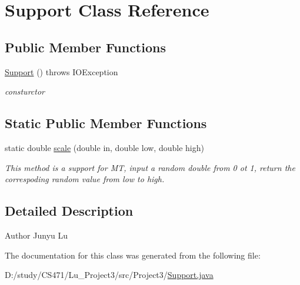 \hypertarget{class_support}{}\section{Support Class Reference}
\label{class_support}
\subsection*{Public Member Functions}
\begin{DoxyCompactItemize}
\item 
\mbox{\label{class_support_a81f1c49c5410f18c834f6bc8a0bf0c01}} 
\mbox{\hyperlink{class_support_a81f1c49c5410f18c834f6bc8a0bf0c01}{Support}} ()  throws I\+O\+Exception 
\begin{DoxyCompactList}\small\item\em consturctor \end{DoxyCompactList}\end{DoxyCompactItemize}
\subsection*{Static Public Member Functions}
\begin{DoxyCompactItemize}
\item 
\mbox{\label{class_support_a993fa1844e5c0d748ec55e7f628b77e2}} 
static double \mbox{\hyperlink{class_support_a993fa1844e5c0d748ec55e7f628b77e2}{scale}} (double in, double low, double high)
\begin{DoxyCompactList}\small\item\em This method is a support for MT, input a random double from 0 ot 1, return the correspoding random value from low to high. \end{DoxyCompactList}\end{DoxyCompactItemize}


\subsection{Detailed Description}
\begin{DoxyAuthor}{Author}
Junyu Lu 
\end{DoxyAuthor}


The documentation for this class was generated from the following file\+:\begin{DoxyCompactItemize}
\item 
D\+:/study/\+C\+S471/\+Lu\+\_\+\+Project3/src/\+Project3/\mbox{\hyperlink{_support_8java}{Support.\+java}}\end{DoxyCompactItemize}
